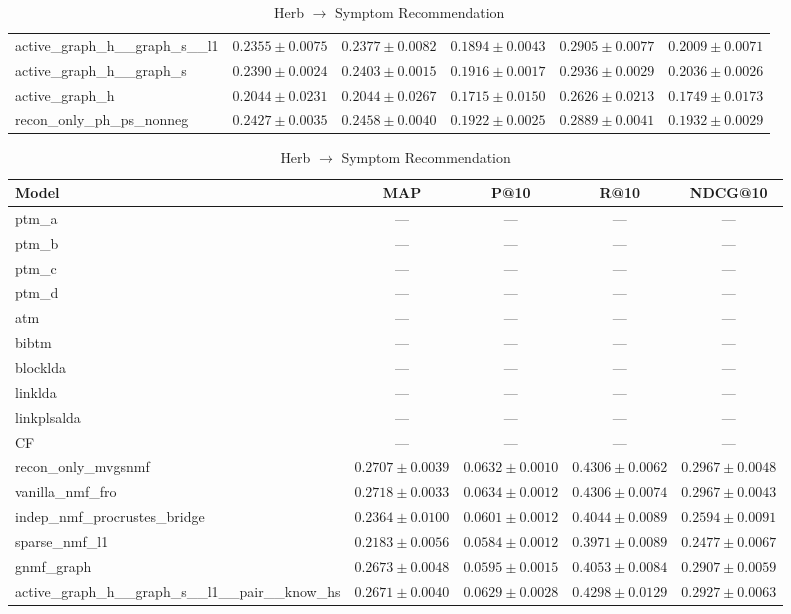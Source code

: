 \begin{table}[htbp]
\begin{subtable}{\textwidth}
\begin{tabular}{lccccc}
active\_graph\_h\_\_graph\_s\_\_l1 & $0.2355\pm0.0075$ & $0.2377\pm0.0082$ & $0.1894\pm0.0043$ & $0.2905\pm0.0077$ & $0.2009\pm0.0071$ \\
active\_graph\_h\_\_graph\_s & $0.2390\pm0.0024$ & $0.2403\pm0.0015$ & $0.1916\pm0.0017$ & $0.2936\pm0.0029$ & $0.2036\pm0.0026$ \\
active\_graph\_h & $0.2044\pm0.0231$ & $0.2044\pm0.0267$ & $0.1715\pm0.0150$ & $0.2626\pm0.0213$ & $0.1749\pm0.0173$ \\
recon\_only\_ph\_ps\_nonneg & $0.2427\pm0.0035$ & $0.2458\pm0.0040$ & $0.1922\pm0.0025$ & $0.2889\pm0.0041$ & $0.1932\pm0.0029$ \\
\bottomrule
\end{tabular}
\end{subtable}
\vspace{0.3cm}
\begin{subtable}{\textwidth}
\centering
\caption{Herb $\to$ Symptom Recommendation}
\begin{tabular}{lcccc}
\toprule
Model & MAP & P@10 & R@10 & NDCG@10 \\
\midrule
ptm\_a & --- & --- & --- & --- \\
ptm\_b & --- & --- & --- & --- \\
ptm\_c & --- & --- & --- & --- \\
ptm\_d & --- & --- & --- & --- \\
atm & --- & --- & --- & --- \\
bibtm & --- & --- & --- & --- \\
blocklda & --- & --- & --- & --- \\
linklda & --- & --- & --- & --- \\
linkplsalda & --- & --- & --- & --- \\
CF & --- & --- & --- & --- \\
recon\_only\_mvgsnmf & $0.2707\pm0.0039$ & $0.0632\pm0.0010$ & $0.4306\pm0.0062$ & $0.2967\pm0.0048$ \\
vanilla\_nmf\_fro & $0.2718\pm0.0033$ & $0.0634\pm0.0012$ & $0.4306\pm0.0074$ & $0.2967\pm0.0043$ \\
indep\_nmf\_procrustes\_bridge & $0.2364\pm0.0100$ & $0.0601\pm0.0012$ & $0.4044\pm0.0089$ & $0.2594\pm0.0091$ \\
sparse\_nmf\_l1 & $0.2183\pm0.0056$ & $0.0584\pm0.0012$ & $0.3971\pm0.0089$ & $0.2477\pm0.0067$ \\
gnmf\_graph & $0.2673\pm0.0048$ & $0.0595\pm0.0015$ & $0.4053\pm0.0084$ & $0.2907\pm0.0059$ \\
active\_graph\_h\_\_graph\_s\_\_l1\_\_pair\_\_know\_hs & $0.2671\pm0.0040$ & $0.0629\pm0.0028$ & $0.4298\pm0.0129$ & $0.2927\pm0.0063$ \\

\end{tabular}
\end{subtable}
\end{table}

